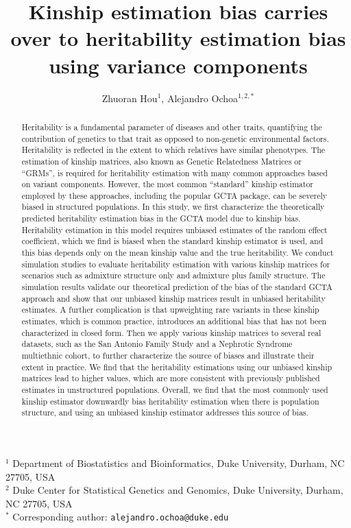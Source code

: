 \documentclass[11pt]{article}
\title{\Large \textbf{Kinship estimation bias carries over to heritability estimation bias using variance components}}
\author{Zhuoran Hou$^1$, Alejandro Ochoa$^{1,2,*}$}
\date{}
\begin{document}
\maketitle

\noindent
$^1$ Department of Biostatistics and Bioinformatics, Duke University, Durham, NC 27705, USA \\
$^2$ Duke Center for Statistical Genetics and Genomics, Duke University, Durham, NC 27705, USA \\
$^*$ Corresponding author: \texttt{alejandro.ochoa@duke.edu}


\begin{abstract}
Heritability is a fundamental parameter of diseases and other traits, quantifying the contribution of genetics to that trait as opposed to non-genetic environmental factors. Heritability is reflected in the extent to which relatives have similar phenotypes. The estimation of kinship matrices, also known as Genetic Relatedness Matrices or “GRMs”, is required for heritability estimation with many common approaches based on variant components. However, the most common “standard” kinship estimator employed by these approaches, including the popular GCTA package, can be severely biased in structured populations. In this study, we first characterize the theoretically predicted heritability estimation bias in the GCTA model due to kinship bias. Heritability estimation in this model requires unbiased estimates of the random effect coefficient, which we find is biased when the standard kinship estimator is used, and this bias depends only on the mean kinship value and the true heritability. We conduct simulation studies to evaluate heritability estimation with various kinship matrices for scenarios such as admixture structure only and admixture plus family structure. The simulation results validate our theoretical prediction of the bias of the standard GCTA approach and show that our unbiased kinship matrices result in unbiased heritability estimates. A further complication is that upweighting rare variants in these kinship estimates, which is common practice, introduces an additional bias that has not been characterized in closed form.  Then we apply various kinship matrices to several real datasets, such as the San Antonio Family Study and a Nephrotic Syndrome multiethnic cohort, to further characterize the source of biases and illustrate their extent in practice. We find that the heritability estimations using our unbiased kinship matrices lead to higher values, which are more consistent with previously published estimates in unstructured populations. Overall, we find that the most commonly used kinship estimator downwardly bias heritability estimation when there is population structure, and using an unbiased kinship estimator addresses this source of bias. 
\end{abstract}
\end{document}
